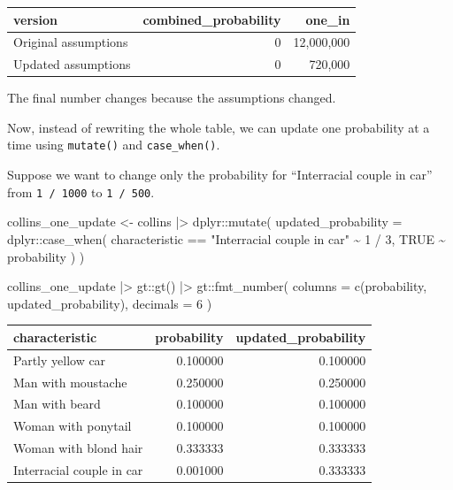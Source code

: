 \documentclass[
  letterpaper,
  DIV=11,
  numbers=noendperiod]{scrreprt}
\newenvironment{Shaded}{\begin{snugshade}}{\end{snugshade}}
\newcommand{\AttributeTok}[1]{\textcolor[rgb]{0.40,0.45,0.13}{#1}}
\newcommand{\ConstantTok}[1]{\textcolor[rgb]{0.56,0.35,0.01}{#1}}
\newcommand{\DecValTok}[1]{\textcolor[rgb]{0.68,0.00,0.00}{#1}}
\newcommand{\FunctionTok}[1]{\textcolor[rgb]{0.28,0.35,0.67}{#1}}
\newcommand{\NormalTok}[1]{\textcolor[rgb]{0.00,0.23,0.31}{#1}}
\newcommand{\OtherTok}[1]{\textcolor[rgb]{0.00,0.23,0.31}{#1}}
\newcommand{\SpecialCharTok}[1]{\textcolor[rgb]{0.37,0.37,0.37}{#1}}
\newcommand{\StringTok}[1]{\textcolor[rgb]{0.13,0.47,0.30}{#1}}
\begin{document}
\begin{table}
\fontsize{12.0pt}{14.0pt}\selectfont
\begin{tabular*}{\linewidth}{@{\extracolsep{\fill}}lrr}
\toprule
version & combined\_probability & one\_in \\ 
\midrule\addlinespace[2.5pt]
Original assumptions & 0 & 12,000,000 \\ 
Updated assumptions & 0 & 720,000 \\ 
\bottomrule
\end{tabular*}
\end{table}

The final number changes because the assumptions changed.

Now, instead of rewriting the whole table, we can update one probability
at a time using \texttt{mutate()} and \texttt{case\_when()}.

Suppose we want to change only the probability for ``Interracial couple
in car'' from \texttt{1\ /\ 1000} to \texttt{1\ /\ 500}.

\begin{Shaded}
\begin{Highlighting}[]
\NormalTok{collins\_one\_update }\OtherTok{\textless{}{-}}\NormalTok{ collins }\SpecialCharTok{|\textgreater{}}
\NormalTok{  dplyr}\SpecialCharTok{::}\FunctionTok{mutate}\NormalTok{(}
    \AttributeTok{updated\_probability =}\NormalTok{ dplyr}\SpecialCharTok{::}\FunctionTok{case\_when}\NormalTok{(}
\NormalTok{      characteristic }\SpecialCharTok{==} \StringTok{"Interracial couple in car"} \SpecialCharTok{\textasciitilde{}} \DecValTok{1} \SpecialCharTok{/} \DecValTok{3}\NormalTok{,}
      \ConstantTok{TRUE} \SpecialCharTok{\textasciitilde{}}\NormalTok{ probability}
\NormalTok{    )}
\NormalTok{  )}

\NormalTok{collins\_one\_update }\SpecialCharTok{|\textgreater{}}
\NormalTok{  gt}\SpecialCharTok{::}\FunctionTok{gt}\NormalTok{() }\SpecialCharTok{|\textgreater{}}
\NormalTok{  gt}\SpecialCharTok{::}\FunctionTok{fmt\_number}\NormalTok{(}
    \AttributeTok{columns =} \FunctionTok{c}\NormalTok{(probability, updated\_probability),}
    \AttributeTok{decimals =} \DecValTok{6}
\NormalTok{  )}
\end{Highlighting}
\end{Shaded}

\begin{table}
\fontsize{12.0pt}{14.0pt}\selectfont
\begin{tabular*}{\linewidth}{@{\extracolsep{\fill}}lrr}
\toprule
characteristic & probability & updated\_probability \\ 
\midrule\addlinespace[2.5pt]
Partly yellow car & 0.100000 & 0.100000 \\ 
Man with moustache & 0.250000 & 0.250000 \\ 
Man with beard & 0.100000 & 0.100000 \\ 
Woman with ponytail & 0.100000 & 0.100000 \\ 
Woman with blond hair & 0.333333 & 0.333333 \\ 
Interracial couple in car & 0.001000 & 0.333333 \\ 
\bottomrule
\end{tabular*}
\end{table}
\end{document}
